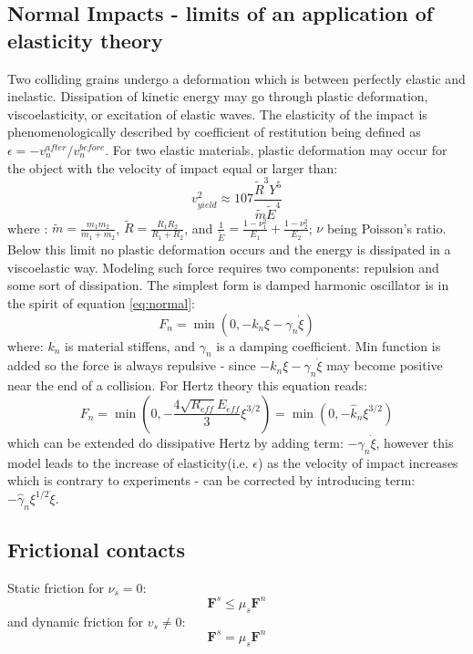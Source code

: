 \documentclass[10pt,a4paper]{article}
\begin{document}
\subsection{Normal Impacts - limits of an application of elasticity theory}
Two colliding grains undergo a deformation which is between perfectly elastic and inelastic. Dissipation of kinetic energy may go through
plastic deformation, viscoelasticity, or excitation of elastic waves. 
The elasticity of the impact is phenomenologically described by coefficient of restitution being defined as $\epsilon = -v^{after}_n/v^{before}_n$. 
For two elastic materials, plastic deformation may occur for the object with the velocity of impact equal or larger than:
\begin{equation} \label{eq:impact}
 v^2_{yield} \approx 107 \frac{\tilde{R}^3 Y^5}{\tilde{m} \tilde{E}^4}
\end{equation}
where : $\tilde{m} = \frac{m_1m_2}{m_1 + m_2}$, $\tilde{R} = \frac{R_1R_2}{R_1 + R_2}$, and $\frac{1}{\tilde{E}} = \frac{1-\nu^2_1}{E_1} +\frac{1-\nu^2_2}{E_2}$; 
$\nu$ being Poisson's ratio. Below this limit no plastic deformation occurs and the energy is dissipated in a viscoelastic way.
Modeling such force requires two components: repulsion and some sort of dissipation. The simplest form is damped harmonic oscillator is in the spirit of equation \ref{eq:normal}:
\begin{equation}
 F_{n} = \min(0,-k_n\xi - \gamma_n \dot{\xi})
\end{equation}
where: $k_n$ is material stiffens, and $\gamma_n$ is a damping coefficient. Min function is added so the force is always repulsive -
since $-k_n\xi - \gamma_n \dot{\xi}$ may become positive near the end of a collision.
For Hertz theory this equation reads:
\begin{equation}
 F_{n} = \min \left(0, -\frac{4 \sqrt{R_{eff}} E_{eff}}{3} \xi^{3/2} \right)  =  \min(0, -\hat{k}_{n}\xi^{3/2})
\end{equation}
which can be extended do dissipative Hertz by adding term: $-\gamma_n \dot{\xi}$, however this model leads to the increase of
elasticity(i.e. $\epsilon$) as the velocity of impact increases which is contrary to experiments - 
can be corrected by introducing term: $ -\hat{\gamma}_n \xi^{1/2} \dot{\xi}$.



\subsection{Frictional contacts}
Static friction for $\nu_s = 0$:
\begin{equation}
 \mathbf{F}^s \le \mu_s \mathbf{F}^n
\end{equation}
and dynamic friction for $v_s \ne 0$:
\begin{equation}
 \mathbf{F}^s = \mu_s \mathbf{F}^n
\end{equation}
\end{document}
